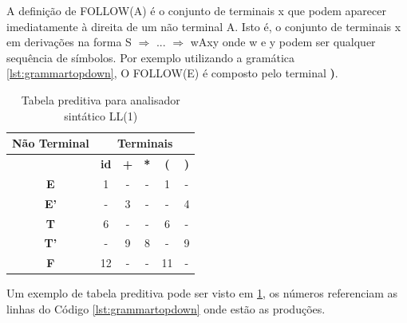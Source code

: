 A definição de FOLLOW(A) é o conjunto de terminais x que podem aparecer imediatamente
à direita de um não terminal A. Isto é, o conjunto de terminais x em derivações na forma 
S $\Rightarrow$ ... $\Rightarrow$ wAxy onde w e y podem ser qualquer sequência de símbolos.
Por exemplo utilizando a gramática \ref{lst:grammartopdown}, O FOLLOW(E) é composto pelo terminal \textbf{)}.

\begin{table}[h]
    \centering
	\caption{Tabela preditiva para analisador sintático LL(1)}
	\label{tbl:predictive}

    \begin{tabular}{cccccc}
        \toprule
        \multicolumn{1}{c}{\textbf{Não Terminal}} & \multicolumn{5}{c}{\textbf{Terminais}} \\
        \midrule
                       & \textbf{id} & \textbf{+} & \textbf{*} & \textbf{(} & \textbf{)}   \\
        \midrule
        \textbf{E}     &     1      &      -      &      -       &     1    &    -    \\
        \textbf{E'}    &     -      &      3      &      -       &     -    &    4    \\
        \textbf{T}     &     6      &      -      &      -       &     6    &    -    \\
        \textbf{T'}    &     -      & 9           &      8       &     -    &    9    \\
        \textbf{F}     &     12     &      -      &      -       &     11   &    -    \\
        \bottomrule
    \end{tabular}
\end{table}

Um exemplo de tabela preditiva pode ser visto em \ref{tbl:predictive}, os números referenciam as linhas 
do Código \ref{lst:grammartopdown} onde estão as produções.